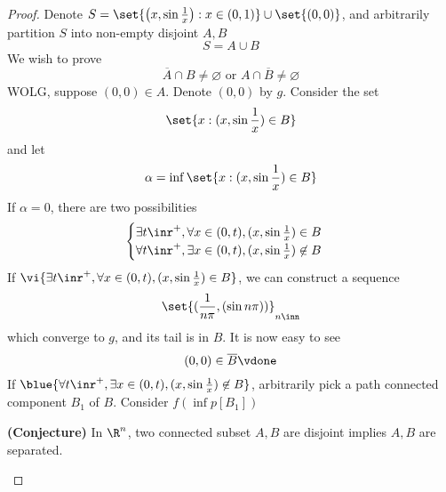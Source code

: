 \documentclass{report}
\begin{document}
\begin{proof}
Denote $S=\set{\left(x,\sin \frac{1}{x} \right):x\in \left(0,1 \right)}\cup \set{\left(0,0 \right)}$, and arbitrarily partition $S$ into non-empty disjoint $A,B$
 \begin{equation*}
S=A\cup B
\end{equation*}
We wish to prove 
\begin{equation*}
\overline{A}\cap B\neq \varnothing\text{ or }A\cap \overline{B}\neq \varnothing
\end{equation*}
WOLG, suppose $\left(0,0 \right)\in A$. Denote $\left(0,0 \right)$ by $g$. Consider the set 
\begin{equation*}
\set{x: (x,\sin \frac{1}{x})\in B}
\end{equation*}
and let 
\begin{equation*}
\alpha =\inf \set{x:(x,\sin \frac{1}{x})\in B}
\end{equation*}
If $\alpha =0$, there are two possibilities
\begin{equation*}
  \begin{cases}
    \exists t\inr^+, \forall x\in (0,t), (x,\sin \frac{1}{x})\in B\\
    \forall t\inr^+, \exists x\in (0,t), (x,\sin \frac{1}{x})\not\in B
  \end{cases}
\end{equation*}
If $\vi{\exists t\inr^+, \forall x\in (0,t), (x,\sin \frac{1}{x})\in B}$, we can construct a sequence 
\begin{equation*}
\set{(\frac{1}{n\pi},(\sin n\pi))}_{n\inn}
\end{equation*}
which converge to $g$, and its tail is in  $B$. It is now easy to see
\begin{equation*}
  (0,0)\in \overline{B}\vdone
\end{equation*}
If $\blue{\forall t\inr^+, \exists x\in (0,t), (x,\sin \frac{1}{x})\not\in B}$, arbitrarily pick a path connected component $B_1$ of $B$. Consider $f(\inf p[B_1])$




\begin{theorem}
\label{2.3.12}
\textbf{(Conjecture)} In $\R^n$, two connected subset $A,B$ are disjoint implies  $A,B$ are separated.
\end{theorem}

\end{proof}
\end{document}
